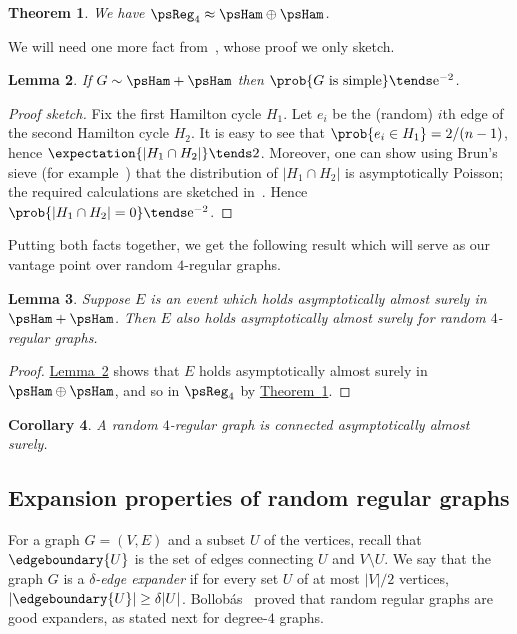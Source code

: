 \documentclass[11pt]{article}
\numberwithin{equation}{section}
\newtheorem{theorem}{Theorem}[section]
\newtheorem{lemma}[theorem]{Lemma}
\newtheorem{corollary}[theorem]{Corollary}
\theoremstyle{definition}
\theoremstyle{plain}
\newcommand{\eee}{\mathrm e}
\newcommand{\expref}[2]{\hyperref[#2]{#1~\ref{#2}}}
\begin{document}
\begin{theorem} \label{thm:kim-wormald}
 We have $\psReg_4 \approx \psHam \oplus \psHam$.
\end{theorem}

We will need one more fact from~\cite{KW}, whose proof we only sketch.

\begin{lemma} \label{lem:ham}
 If $G \sim \psHam + \psHam$ then $\prob{G \text{ is simple}} \tends \eee^{-2}$.
\end{lemma}
\begin{proof}[Proof sketch]
 Fix the first Hamilton cycle $H_1$. Let $e_i$ be the (random) $i$th edge of the second Hamilton cycle $H_2$. It is easy to see that $\prob{e_i \in H_1} = 2/(n-1)$, hence $\expectation{|H_1 \cap H_2|} \tends 2$. Moreover, one can show using Brun's sieve (for example~\cite[Theorem 8.3.1]{AS}) that the distribution of $|H_1 \cap H_2|$ is asymptotically Poisson; the required calculations are sketched in~\cite[\S 2(iii)]{KW}. Hence $\prob{|H_1 \cap H_2| = 0} \tends \eee^{-2}$.
\end{proof}

Putting both facts together, we get the following result which will serve as our vantage point over random $4$-regular graphs.

\begin{lemma} \label{lem:model}
 Suppose $E$ is an event which holds asymptotically almost surely in $\psHam + \psHam$. Then $E$ also holds asymptotically almost surely for random $4$-regular graphs.
\end{lemma}
\begin{proof}
 \expref{Lemma}{lem:ham} shows that $E$ holds asymptotically almost surely in $\psHam \oplus \psHam$, and so in $\psReg_4$ by \expref{Theorem}{thm:kim-wormald}.
\end{proof}

\begin{corollary} \label{cor:connected}
 A random $4$-regular graph is connected asymptotically almost surely.
\end{corollary}

\subsection{Expansion properties of random regular graphs}

For a graph $G=(V,E)$ and a subset $U$ of the vertices, recall that $\edgeboundary{U}$ is the set of edges connecting $U$ and $V \setminus U$. We say that the graph $G$ is a \emph{$\delta$-edge expander} if for every set $U$ of at most $|V|/2$ vertices, $|\edgeboundary{U}| \geq \delta |U|$. Bollob\'as~\cite{Bollobas88Isoperimetric} proved that random regular graphs are good expanders, as stated next for degree-$4$ graphs.
\end{document}
